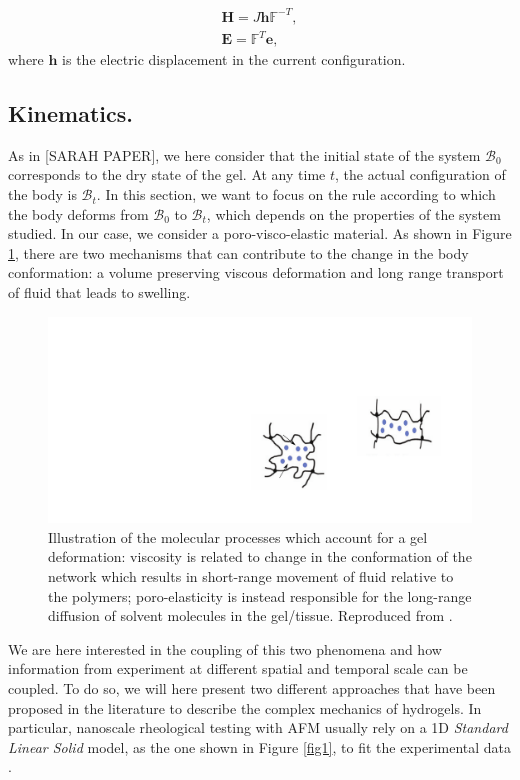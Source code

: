 \documentclass[runningheads]{llncs}
\newcommand{\F}{\ensuremath{\mathbb{F}}}
\begin{document}
\begin{eqnarray}
\mathbf{H} = J \mathbf{h}\F^{-T},\\
\mathbf{E} = \F^T \mathbf{e},
\end{eqnarray}
where $\mathbf{h}$ is the electric displacement in the current configuration.

\subsection{Kinematics.}

As in [SARAH PAPER], we here consider that the initial state of the system $\mathcal{B}_0$ corresponds to the dry state of the gel. At any time $t$, the actual configuration of the body is $\mathcal{B}_t$. In this section, we want to focus on the rule according to which the body deforms from $\mathcal{B}_0$ to $\mathcal{B}_t$, which depends on the properties of the system studied. In our case, we consider a poro-visco-elastic material. As shown in Figure \ref{deformation}, there are two mechanisms that can contribute to the change in the body conformation: a volume preserving viscous deformation and long range transport of fluid that leads to swelling. 

\begin{figure}[h!]
	\centering
	\includegraphics[scale=0.325]{images/visco_poro}
	\caption{Illustration of the molecular processes which account for a gel deformation: viscosity is related to change in the conformation of the network which results in short-range movement of fluid relative to the polymers; poro-elasticity is instead responsible for the long-range diffusion of solvent molecules in the gel/tissue. Reproduced from \cite{viscoporo}.}
	\label{deformation}
\end{figure}
 
We are here interested in the coupling of this two phenomena and how information from experiment at different spatial and temporal scale can be coupled. To do so, we will here present two different approaches that have been proposed in the literature to describe the complex mechanics of hydrogels. In particular, nanoscale rheological testing with AFM usually rely on a 1D \textit{Standard Linear Solid} model, as the one shown in Figure \ref{fig1}, to fit the experimental data \cite{Article1,viscoporo}.  
\end{document}

